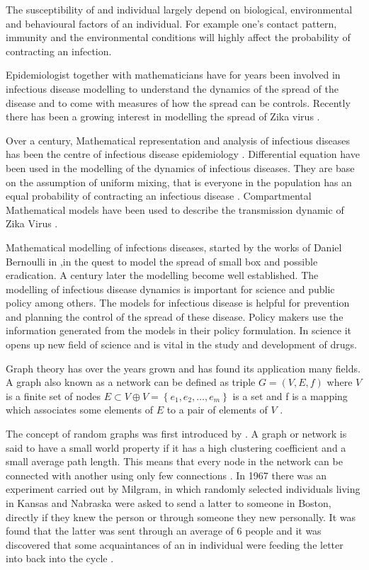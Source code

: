The susceptibility of and individual largely depend on biological, environmental and behavioural factors of an individual. For example one's contact pattern, immunity and the environmental conditions will highly affect the probability of contracting an infection.

Epidemiologist together with mathematicians have for years been involved in infectious disease modelling to understand the dynamics of the spread of the disease and to come with measures of how the spread can be controls. Recently there has been a growing interest in modelling the spread of Zika virus \citep{ku2016}.

Over a  century, Mathematical representation and analysis of infectious diseases has been the centre of  infectious disease epidemiology \citep{b2005}. Differential equation have been used in the modelling of the dynamics of infectious diseases. They are base on the assumption of uniform mixing, that is everyone in the population has an equal probability of contracting an infectious disease \citep{kaplan2002emergency}.
Compartmental Mathematical models have been used to describe the transmission dynamic of Zika Virus \citep{gao2016}.

Mathematical modelling of infections diseases, started by the works of Daniel Bernoulli in \cite{bernoulli1760essai},in the quest to model the spread of small box and possible eradication. A century later the modelling become well established. The modelling of infectious disease dynamics is important for science and public policy among others. The models for infectious disease is helpful for prevention and planning the control of the spread of these disease. Policy makers use the information generated from the models in their policy formulation. In science it opens up new field of science and is vital in the study and development of drugs.


 

Graph theory has over the years grown and has found its application many fields. A graph also known as a network   can be  defined as triple $G = (V,E,f)$ where $V$ is a finite set of nodes $E \subset V \oplus V = \left\lbrace e_1,e_2,\dots ,e_m \right\rbrace$ is a set and f is a mapping which associates some elements of $E$ to a pair of elements of $V$ \citep{estrada2012structure}. 



 The concept of random graphs was first introduced by \cite{erdodblac1959ldquo}. A graph or network is said to have a small world property if it has a high clustering coefficient and a small average path length. This means that every node in the network can be connected with another using only few connections \citep{estrada2015first}. In 1967 there was an experiment carried out by Milgram, in which randomly selected individuals living in Kansas and Nabraska were asked to send a latter to someone in Boston, directly if they knew the person or through someone they new personally. It was found that the latter was sent through an average of 6 people and it was discovered that some acquaintances of an in individual were feeding the letter into back into the cycle \citep{travers1967small}.

